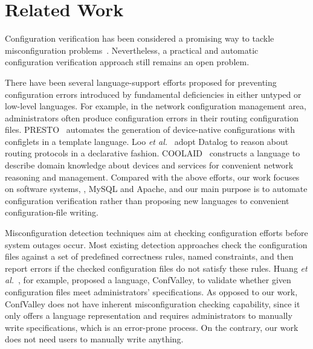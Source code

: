 
\section{Related Work}

\iffalse
Configuration verification has been considered a promising way  
to tackle misconfiguration problems~\cite{xu15systems}.
Nevertheless, a practical and automatic configuration
verification approach still remains an open problem.

There have been several language-support efforts proposed for preventing
configuration errors introduced by fundamental deficiencies in
either untyped or low-level languages. For example, in the network
configuration management area, administrators often
produce configuration errors in their routing configuration files.
PRESTO~\cite{enck07configuration} 
automates the generation of device-native configurations
with configlets in a template language. 
Loo {\em et al.}~\cite{loo05declarative} adopt Datalog to reason about 
routing protocols in a declarative fashion. 
COOLAID~\cite{chen10declarative} constructs
a language to describe domain knowledge about devices and
services for convenient network reasoning and management.
Compared with the above efforts, our work focuses on software systems, 
\eg, MySQL and Apache, and our main purpose is to automate configuration
verification rather than proposing new languages 
to convenient configuration-file writing. 

Misconfiguration detection techniques aim at checking configuration
efforts before system outages occur.
Most existing detection approaches check 
the configuration files against a set of predefined correctness 
rules, named constraints, and then report errors if 
the checked configuration files do not satisfy these rules.
Huang {\em et al.}~\cite{huang15confvalley},
for example, proposed a 
language, ConfValley, to validate 
whether given configuration files meet administrators' specifications. 
As opposed to our work, ConfValley does not
have inherent misconfiguration checking capability, since it only offers
a language representation and requires administrators to
manually write specifications, which is an error-prone
process. On the contrary, our work does not need users to manually
write anything.

